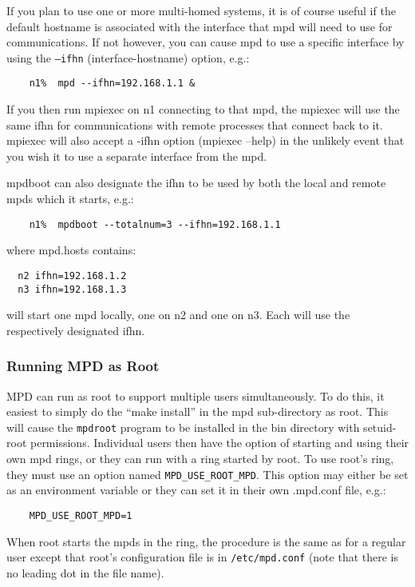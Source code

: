 \documentclass[dvipdfm,11pt]{article}
\begin{document}
If you plan to use one or more multi-homed systems, it is of course useful if
the default hostname is associated with the interface that mpd will need
to use for communications.  If not however, you can cause mpd to use a
specific interface by using the \texttt{--ifhn} (interface-hostname) option, e.g.:
\begin{verbatim}
    n1%  mpd --ifhn=192.168.1.1 &
\end{verbatim}

If you then run mpiexec on n1 connecting to that mpd, the mpiexec will
use the same ifhn for communications with remote processes that connect
back to it.  mpiexec will also accept a -ifhn option (mpiexec --help)
in the unlikely event that you wish it to use a separate interface from
the mpd.

mpdboot can also designate the ifhn to be used by both the local and remote
mpds which it starts, e.g.:
\begin{verbatim}
    n1%  mpdboot --totalnum=3 --ifhn=192.168.1.1 
\end{verbatim}
where mpd.hosts contains:
\begin{verbatim}
  n2 ifhn=192.168.1.2
  n3 ifhn=192.168.1.3
\end{verbatim}
will start one mpd locally, one on n2 and one on n3.  Each will use the
respectively designated ifhn.


\subsubsection{Running MPD as Root}
\label{sec:mpd-root}

MPD can run as root to support multiple users simultaneously.  To do this,
it easiest to simply do the ``make install'' in the mpd sub-directory as
root.  This will cause the \texttt{mpdroot} program to be installed in
the bin directory with setuid-root permissions.  Individual users then
have the option of starting and using their own mpd rings, or they can run
with a ring started by root.  To use root's ring, they must use an option
named \texttt{MPD\_USE\_ROOT\_MPD}.  This option may either be set as an environment
variable or they can set it in their own .mpd.conf file, e.g.:
\begin{verbatim}
    MPD_USE_ROOT_MPD=1
\end{verbatim}
When root starts the mpds in the ring, the procedure is the same as for a regular
user except that root's configuration file is in \texttt{/etc/mpd.conf} (note that
there is no leading dot in the file name).
\end{document}
